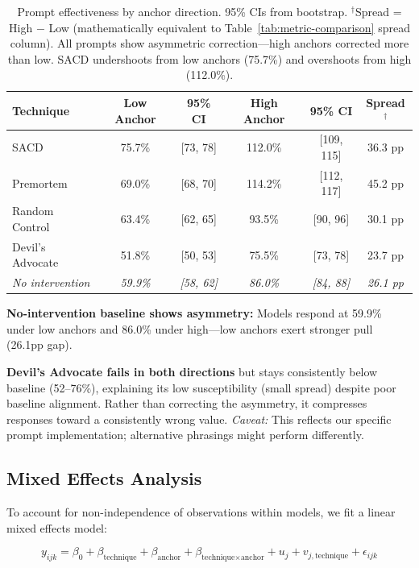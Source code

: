 \documentclass[11pt]{article}
\begin{document}
\begin{table}[H]
\centering
\begin{tabular}{lccccc}
\toprule
Technique & Low Anchor & 95\% CI & High Anchor & 95\% CI & Spread$^\dagger$ \\
\midrule
SACD & 75.7\% & [73, 78] & 112.0\% & [109, 115] & 36.3 pp \\
Premortem & 69.0\% & [68, 70] & 114.2\% & [112, 117] & 45.2 pp \\
Random Control & 63.4\% & [62, 65] & 93.5\% & [90, 96] & 30.1 pp \\
Devil's Advocate & 51.8\% & [50, 53] & 75.5\% & [73, 78] & 23.7 pp \\
\midrule
\textit{No intervention} & \textit{59.9\%} & \textit{[58, 62]} & \textit{86.0\%} & \textit{[84, 88]} & \textit{26.1 pp} \\
\bottomrule
\end{tabular}
\caption{Prompt effectiveness by anchor direction. 95\% CIs from bootstrap. $^\dagger$Spread = High $-$ Low (mathematically equivalent to Table~\ref{tab:metric-comparison} spread column). All prompts show asymmetric correction---high anchors corrected more than low. SACD undershoots from low anchors (75.7\%) and overshoots from high (112.0\%).}
\label{tab:anchor-asymmetry}
\end{table}

\textbf{No-intervention baseline shows asymmetry:} Models respond at 59.9\% under low anchors and 86.0\% under high---low anchors exert stronger pull (26.1pp gap).

\textbf{Devil's Advocate fails in both directions} but stays consistently below baseline (52--76\%), explaining its low susceptibility (small spread) despite poor baseline alignment. Rather than correcting the asymmetry, it compresses responses toward a consistently wrong value. \textit{Caveat:} This reflects our specific prompt implementation; alternative phrasings might perform differently.

\subsection{Mixed Effects Analysis}
\label{sec:mixed-effects}

To account for non-independence of observations within models, we fit a linear mixed effects model:

\begin{equation}
y_{ijk} = \beta_0 + \beta_{\text{technique}} + \beta_{\text{anchor}} + \beta_{\text{technique} \times \text{anchor}} + u_j + v_{j,\text{technique}} + \epsilon_{ijk}
\end{equation}
\end{document}
